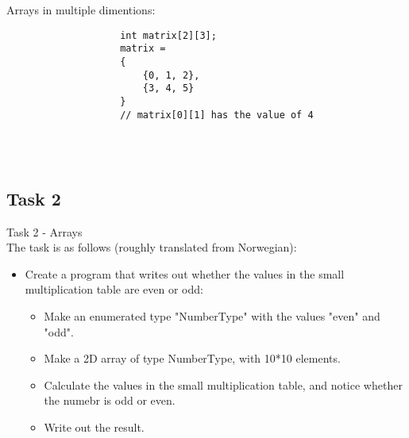 \documentclass{report}
\begin{document}
			\begin{minipage}{\linewidth}
				Arrays in multiple dimentions:
				\begin{lstlisting}
					int matrix[2][3];
					matrix =
					{
						{0, 1, 2},
						{3, 4, 5}
					}
					// matrix[0][1] has the value of 4
				\end{lstlisting}
			\end{minipage}
			\\ \\
			
			
			\subsection{Task 2}
				Task 2 - Arrays \\
				The task is as follows (roughly translated from Norwegian):
				
				\begin{itemize}
					\item Create a program that writes out whether the values in the small multiplication table are even or odd:
					\begin{itemize}
						\item Make an enumerated type "NumberType" with the values "even" and "odd".
						\item Make a 2D array of type NumberType, with 10*10 elements.
						\item Calculate the values in the small multiplication table, and notice whether the numebr is odd or even.
						\item Write out the result.
					\end{itemize}
				\end{itemize}
				
\end{document}
